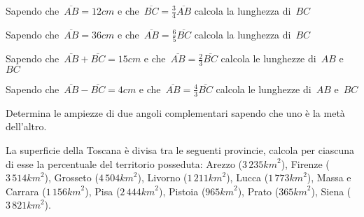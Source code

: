\begin{multicols}{2}
 \begin{esercizio}
 \label{ese:3.99}
Sapendo che~\(\overline{AB}=12\unit{cm}\) e che~\(\overline{BC}=\frac{3}{4}
\overline{AB}\) calcola la lunghezza di~\(BC\)
\end{esercizio}

\begin{esercizio}
 \label{ese:3.100}
Sapendo che~\(\overline{AB}=36\unit{cm}\) e che~\(\overline{AB}=\frac{6}{5}
\overline{BC}\) calcola la lunghezza di~\(BC\)
\end{esercizio}

\begin{esercizio}
 \label{ese:3.101}
Sapendo che~\(\overline{AB}+\overline{BC}=15\unit{cm}\) e che~\(\overline{AB}=
\frac{2}{3}\overline{BC}\) calcola le lunghezze di~\(AB\) e~\(BC\)
\end{esercizio}

\begin{esercizio}
 \label{ese:3.102}
Sapendo che~\(\overline{AB}-\overline{BC}=4\unit{cm}\) e che~\(\overline{AB}=
\frac{4}{3}\overline{BC}\) calcola le lunghezze di~\(AB\) e~\(BC\)
\end{esercizio}

\begin{esercizio}
 \label{ese:3.103}
Determina le ampiezze di due angoli complementari sapendo che uno è la metà 
dell'altro.
\end{esercizio}

% 

\begin{esercizio}
 \label{ese:3.106}
La superficie della Toscana è divisa tra le seguenti provincie, calcola per 
ciascuna di esse la percentuale del territorio posseduta: 
Arezzo (\(3\,235\unit{km}^2\)), Firenze (\(3\,514\unit{km}^2\)),
Grosseto (\(4\,504\unit{km}^2\)), Livorno (\(1\,211\unit{km}^2\)), 
Lucca (\(1\,773\unit{km}^2\)), Massa e Carrara (\(1\,156\unit{km}^2\)), 
Pisa (\(2\,444\unit{km}^2\)), Pistoia (\(965\unit{km}^2\)),
Prato (\(365\unit{km}^2\)), Siena (\(3\,821\unit{km}^2\)).
\end{esercizio}


\end{multicols}
